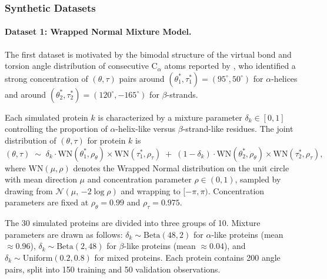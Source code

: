 \documentclass{article}
\begin{document}
\subsubsection{Synthetic Datasets}
\label{sec:sim_data}

\paragraph{Dataset 1: Wrapped Normal Mixture Model.}
The first dataset is motivated by the bimodal structure of the
virtual bond and torsion angle distribution of consecutive $\mathrm{C}_\alpha$
atoms reported by \cite{Hamelryck2006}, who identified a strong concentration
of $(\theta, \tau)$ pairs around
$(\theta^*_1, \tau^*_1) = (95^\circ, 50^\circ)$ for $\alpha$-helices
and around
$(\theta^*_2, \tau^*_2) = (120^\circ, -165^\circ)$ for $\beta$-strands.

Each simulated protein $k$ is characterized by a mixture parameter
$\delta_k \in [0,1]$ controlling the proportion of $\alpha$-helix-like
versus $\beta$-strand-like residues.
The joint distribution of $(\theta, \tau)$ for protein $k$ is
\begin{equation}
(\theta, \tau) \;\sim\;
\delta_k \cdot \mathrm{WN}(\theta^*_1, \rho_\theta)
            \times \mathrm{WN}(\tau^*_1, \rho_\tau)
\;+\;
(1-\delta_k) \cdot \mathrm{WN}(\theta^*_2, \rho_\theta)
              \times \mathrm{WN}(\tau^*_2, \rho_\tau),
\end{equation}
where $\mathrm{WN}(\mu, \rho)$ denotes the Wrapped Normal distribution
on the unit circle with mean direction $\mu$ and concentration
parameter $\rho \in (0,1)$, sampled by drawing from
$\mathcal{N}(\mu,\, {-2\log\rho})$ and wrapping to $[-\pi, \pi)$.
Concentration parameters are fixed at $\rho_\theta = 0.99$ and
$\rho_\tau = 0.975$.

The 30 simulated proteins are divided into three groups of 10.
Mixture parameters are drawn as follows:
$\delta_k \sim \mathrm{Beta}(48,2)$ for $\alpha$-like proteins (mean $\approx 0.96$),
$\delta_k \sim \mathrm{Beta}(2,48)$ for $\beta$-like proteins (mean $\approx 0.04$),
and $\delta_k \sim \mathrm{Uniform}(0.2, 0.8)$ for mixed proteins.
Each protein contains 200 angle pairs, split into 150 training and 50 validation observations.
\end{document}
